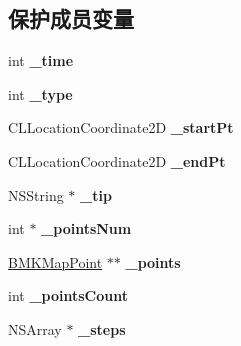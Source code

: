 \subsection*{保护成员变量}
\begin{DoxyCompactItemize}
\item 
\hypertarget{interface_b_m_k_route_a788e24a4fa2034b07f63a096b41a202c}{int {\bfseries \-\_\-time}}\label{interface_b_m_k_route_a788e24a4fa2034b07f63a096b41a202c}

\item 
\hypertarget{interface_b_m_k_route_a76090867eb96a4b86c08ec8c7fc98fce}{int {\bfseries \-\_\-type}}\label{interface_b_m_k_route_a76090867eb96a4b86c08ec8c7fc98fce}

\item 
\hypertarget{interface_b_m_k_route_a8f8c8728df35995a91cd2e43c7ab123e}{C\-L\-Location\-Coordinate2\-D {\bfseries \-\_\-start\-Pt}}\label{interface_b_m_k_route_a8f8c8728df35995a91cd2e43c7ab123e}

\item 
\hypertarget{interface_b_m_k_route_a51b195ee5321cc5d2b7316b8c44ebb83}{C\-L\-Location\-Coordinate2\-D {\bfseries \-\_\-end\-Pt}}\label{interface_b_m_k_route_a51b195ee5321cc5d2b7316b8c44ebb83}

\item 
\hypertarget{interface_b_m_k_route_aa2bf575165b90965d623e3edff14b086}{N\-S\-String $\ast$ {\bfseries \-\_\-tip}}\label{interface_b_m_k_route_aa2bf575165b90965d623e3edff14b086}

\item 
\hypertarget{interface_b_m_k_route_a917e438c9f7b623f47c431842a3cf28b}{int $\ast$ {\bfseries \-\_\-points\-Num}}\label{interface_b_m_k_route_a917e438c9f7b623f47c431842a3cf28b}

\item 
\hypertarget{interface_b_m_k_route_a4d089d8e8dabc41e1d7015ccc53dbaba}{\hyperlink{struct_b_m_k_map_point}{B\-M\-K\-Map\-Point} $\ast$$\ast$ {\bfseries \-\_\-points}}\label{interface_b_m_k_route_a4d089d8e8dabc41e1d7015ccc53dbaba}

\item 
\hypertarget{interface_b_m_k_route_abbea91078abce7b16e66fc37dec39d2d}{int {\bfseries \-\_\-points\-Count}}\label{interface_b_m_k_route_abbea91078abce7b16e66fc37dec39d2d}

\item 
\hypertarget{interface_b_m_k_route_a733a7452324bf21732e119ee70f75e45}{N\-S\-Array $\ast$ {\bfseries \-\_\-steps}}\label{interface_b_m_k_route_a733a7452324bf21732e119ee70f75e45}

\end{DoxyCompactItemize}
